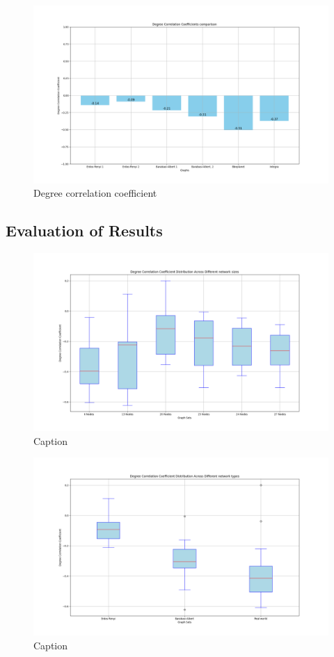 \begin{figure}
    \centering
    \includegraphics[width=0.9\linewidth]{images/FINAL-TOPO-COMP/Degree-correlation-coeff/deg-coeff-27.png}
    \caption{Degree correlation coefficient}
    \label{fig:enter-label}
\end{figure}

\subsection{Evaluation of Results}

\begin{figure}
    \centering
    \includegraphics[width=0.9\linewidth]{images/FINAL-TOPO-COMP/Degree-coeff-distrib/Distrib-by-size.png}
    \caption{Caption}
    \label{fig:enter-label}
\end{figure}

\begin{figure}
    \centering
    \includegraphics[width=0.9\linewidth]{images/FINAL-TOPO-COMP/Degree-coeff-distrib/Distrib-by-type.png}
    \caption{Caption}
    \label{fig:enter-label}
\end{figure}

